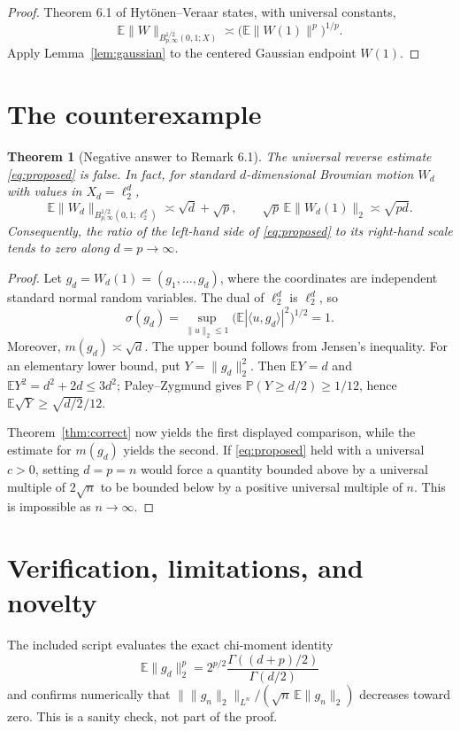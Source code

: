 \documentclass[11pt]{article}
\newtheorem{theorem}{Theorem}
\newcommand{\E}{\mathbb E}
\newcommand{\Besov}{B^{1/2}_{p,\infty}(0,1;X)}
\begin{document}
\begin{proof}
Theorem 6.1 of Hytönen--Veraar \cite{HV} states, with universal constants,
\[
 \E\|W\|_{\Besov}\asymp
 \bigl(\E\|W(1)\|^p\bigr)^{1/p}.
\]
Apply Lemma~\ref{lem:gaussian} to the centered Gaussian endpoint $W(1)$.
\end{proof}

\section{The counterexample}

\begin{theorem}[Negative answer to Remark 6.1]\label{thm:counterexample}
The universal reverse estimate \eqref{eq:proposed} is false. In fact, for
standard $d$-dimensional Brownian motion $W_d$ with values in
$X_d=\ell_2^d$,
\[
 \E\|W_d\|_{B^{1/2}_{p,\infty}(0,1;\ell_2^d)}
 \asymp \sqrt d+\sqrt p,
 \qquad
 \sqrt p\,\E\|W_d(1)\|_2\asymp\sqrt{pd}.
\]
Consequently, the ratio of the left-hand side of \eqref{eq:proposed} to its
right-hand scale tends to zero along $d=p\to\infty$.
\end{theorem}

\begin{proof}
Let $g_d=W_d(1)=(g_1,\ldots,g_d)$, where the coordinates are independent
standard normal random variables. The dual of $\ell_2^d$ is $\ell_2^d$, so
\[
 \sigma(g_d)=
 \sup_{\|u\|_2\le1}\bigl(\E|\langle u,g_d\rangle|^2\bigr)^{1/2}=1.
\]
Moreover, $m(g_d)\asymp\sqrt d$. The upper bound follows from Jensen's
inequality. For an elementary lower bound, put $Y=\|g_d\|_2^2$. Then
$\E Y=d$ and $\E Y^2=d^2+2d\le3d^2$; Paley--Zygmund gives
$\mathbb P(Y\ge d/2)\ge1/12$, hence
$\E\sqrt Y\ge \sqrt{d/2}/12$.

Theorem~\ref{thm:correct} now yields the first displayed comparison, while
the estimate for $m(g_d)$ yields the second. If \eqref{eq:proposed} held with
a universal $c>0$, setting $d=p=n$ would force a quantity bounded above by a
universal multiple of $2\sqrt n$ to be bounded below by a positive universal
multiple of $n$. This is impossible as $n\to\infty$.
\end{proof}

\section{Verification, limitations, and novelty}

The included script evaluates the exact chi-moment identity
\[
 \E\|g_d\|_2^p
 =2^{p/2}\frac{\Gamma((d+p)/2)}{\Gamma(d/2)}
\]
and confirms numerically that
$\|\|g_n\|_2\|_{L^n}/(\sqrt n\,\E\|g_n\|_2)$ decreases toward zero.
This is a sanity check, not part of the proof.
\end{document}
